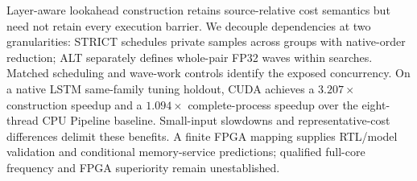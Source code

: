Layer-aware lookahead construction retains source-relative cost semantics but need not retain every execution barrier. We decouple dependencies at two granularities: STRICT schedules private samples across groups with native-order reduction; ALT separately defines whole-pair FP32 waves within searches. Matched scheduling and wave-work controls identify the exposed concurrency. On a native LSTM same-family tuning holdout, CUDA achieves a $3.207\times$ construction speedup and a $1.094\times$ complete-process speedup over the eight-thread CPU Pipeline baseline. Small-input slowdowns and representative-cost differences delimit these benefits. A finite FPGA mapping supplies RTL/model validation and conditional memory-service predictions; qualified full-core frequency and FPGA superiority remain unestablished.

